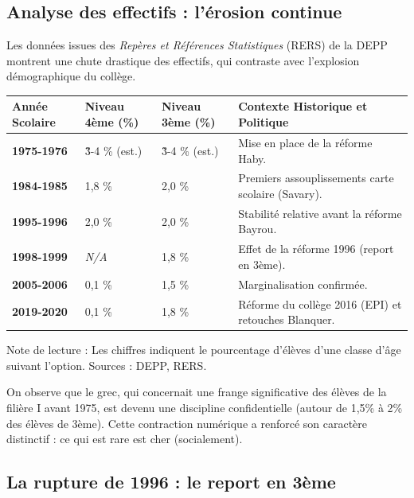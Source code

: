 \subsection{Analyse des effectifs : l'érosion continue}

Les données issues des \textit{Repères et Références Statistiques} (RERS) de la DEPP montrent une
chute drastique des effectifs, qui contraste avec l'explosion démographique du collège.

\begin{table}[h!]\small\centering\begin{tabular}{| p{2cm} | p{2.2cm} | p{2.2cm} | p{2.2cm} |}\hline\textbf{Année Scolaire} & \textbf{Niveau 4ème (\%)} & \textbf{Niveau 3ème (\%)} & \textbf{Contexte Historique et Politique} \\ \hline\textbf{1975-1976} & \~3-4 \% (est.) & \~3-4 \% (est.) & Mise en place de la réforme Haby. \\ \hline\textbf{1984-1985} & 1,8 \% & 2,0 \% & Premiers assouplissements carte scolaire (Savary). \\ \hline\textbf{1995-1996} & 2,0 \% & 2,0 \% & Stabilité relative avant la réforme Bayrou.\cite{I-3-1-ref24} \\ \hline\textbf{1998-1999} & \textit{N/A} & 1,8 \% & Effet de la réforme 1996 (report en 3ème). \\ \hline\textbf{2005-2006} & 0,1 \% & 1,5 \% & Marginalisation confirmée.\cite{I-3-1-ref25} \\ \hline\textbf{2019-2020} & 0,1 \% & 1,8 \% & Réforme du collège 2016 (EPI) et retouches Blanquer.\cite{I-3-1-ref26} \\ \hline\end{tabular}\end{table}Note de lecture : Les chiffres indiquent le pourcentage d'élèves d'une classe d'âge suivant
l'option. Sources : DEPP, RERS.\cite{I-3-1-ref24}

On observe que le grec, qui concernait une frange significative des élèves de la filière I avant
1975, est devenu une discipline confidentielle (autour de 1,5\% à 2\% des élèves de 3ème). Cette
contraction numérique a renforcé son caractère distinctif : ce qui est rare est cher (socialement).



\subsection{La rupture de 1996 : le report en 3ème}

